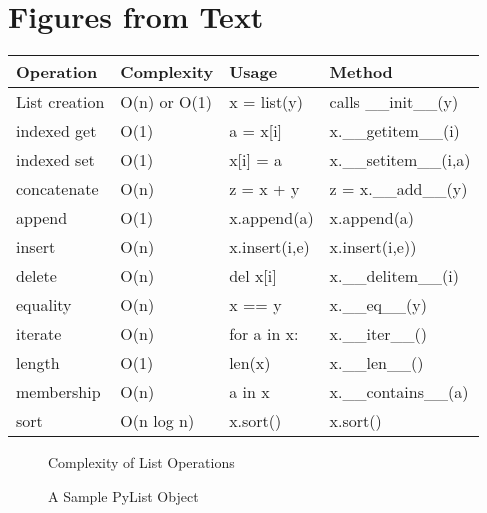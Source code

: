 \documentclass[letterpaper,10pt,english]{sphinxmanual}
\begin{document}
\section{Figures from Text}
\label{\detokenize{chap4/chap4:figures-from-text}}

\begin{savenotes}\sphinxattablestart
\centering
\begin{tabulary}{\linewidth}[t]{|T|T|T|T|}
\hline
\sphinxstyletheadfamily 
Operation
&\sphinxstyletheadfamily 
Complexity
&\sphinxstyletheadfamily 
Usage
&\sphinxstyletheadfamily 
Method
\\
\hline
List creation
&
O(n) or O(1)
&
x = list(y)
&
calls \_\_init\_\_(y)
\\
\hline
indexed get
&
O(1)
&
a = x{[}i{]}
&
x.\_\_getitem\_\_(i)
\\
\hline
indexed set
&
O(1)
&
x{[}i{]} = a
&
x.\_\_setitem\_\_(i,a)
\\
\hline
concatenate
&
O(n)
&
z = x + y
&
z = x.\_\_add\_\_(y)
\\
\hline
append
&
O(1)
&
x.append(a)
&
x.append(a)
\\
\hline
insert
&
O(n)
&
x.insert(i,e)
&
x.insert(i,e))
\\
\hline
delete
&
O(n)
&
del x{[}i{]}
&
x.\_\_delitem\_\_(i)
\\
\hline
equality
&
O(n)
&
x == y
&
x.\_\_eq\_\_(y)
\\
\hline
iterate
&
O(n)
&
for a in x:
&
x.\_\_iter\_\_()
\\
\hline
length
&
O(1)
&
len(x)
&
x.\_\_len\_\_()
\\
\hline
membership
&
O(n)
&
a in x
&
x.\_\_contains\_\_(a)
\\
\hline
sort
&
O(n log n)
&
x.sort()
&
x.sort()
\\
\hline
\end{tabulary}
\par
\sphinxattableend\end{savenotes}

\begin{figure}[htbp]
\centering
\capstart

\noindent{}
\caption{Complexity of List Operations}\label{\detokenize{chap4/chap4:id1}}\end{figure}

\begin{figure}[htbp]
\centering
\capstart

\noindent{}
\caption{A Sample PyList Object}\label{\detokenize{chap4/chap4:id2}}\end{figure}
\end{document}
